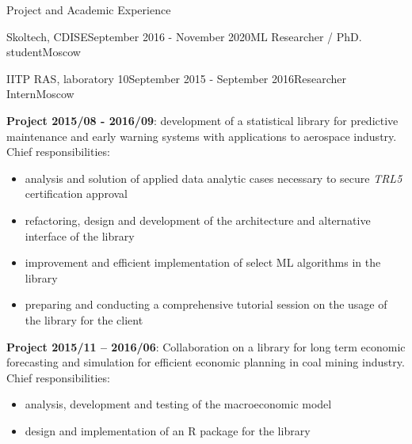 \documentclass{resume} %
\begin{document}
\begin{rSection}{Project and Academic Experience}
\begin{rSubsection}{Skoltech, CDISE}{September 2016 - November 2020}{ML Researcher / PhD. student}{Moscow}

\end{rSubsection}

\bigskip
\begin{rSubsection}{IITP RAS, laboratory 10}{September 2015 - September 2016}{Researcher Intern}{Moscow}
    \item \textbf{Project 2015/08 - 2016/09}: development of a statistical library
    for predictive maintenance and early warning systems with applications to
    aerospace industry.
    Chief responsibilities: \begin{itemize}
        \item analysis and solution of applied data analytic cases necessary to
        secure \textit{TRL5} certification approval

        \item refactoring, design and development of the architecture and alternative
        interface of the library

        \item improvement and efficient implementation of select ML algorithms in
        the library

        \item preparing and conducting a comprehensive tutorial session on the usage
        of the library for the client
    \end{itemize}

    \medskip
    \item \textbf{Project 2015/11 -- 2016/06}: Collaboration on a library for long
    term economic forecasting and simulation for efficient economic planning in coal
    mining industry.
    Chief responsibilities: \begin{itemize}
        \item analysis, development and testing of the macroeconomic model

        \item design and implementation of an R package for the library


\end{itemize}
\end{rSubsection}
\end{rSection}
\end{document}
